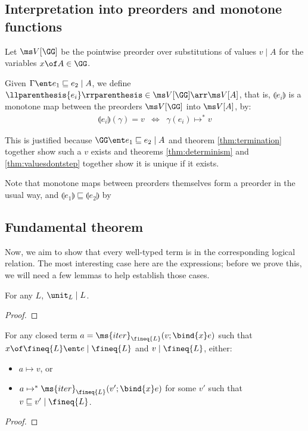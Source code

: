 \documentclass{article}
\newcommand{\ale}{\sqsubseteq}
\newcommand{\iter}[4]{\ms{iter}_{#1}({#2}; \bind{#3}#4)}
\newcommand{\step}{\mapsto}
\newcommand{\steps}{\step^*}
\newcommand{\lr}[2]{#2\mathrel{|}#1}
\newcommand{\lrcx}[3]{#1 \ent \lr{#2}{#3}}
\begin{document}

\subsection{Interpretation into preorders and monotone functions}

\newcommand{\I}[1]{\llparenthesis{#1}\rrparenthesis}

Let $\Val{\GG}$ be the pointwise preorder over substitutions of values
$\lr{A}{v}$ for the variables $x \of A \in \GG$.

Given $\lrcx{\Gamma}{A}{e_1 \ale e_2}$, we define $\I{e_i} \in \Val{\GG} \arr
\Val{A}$, that is, $\I{e_i}$ is a monotone map between the preorders $\Val{\GG}$
into $\Val{A}$, by:
\[\begin{array}{rcll}
  \I{e_i}(\gamma) = v &\iff& \gamma(e_i) \steps v
\end{array}\]

This is justified because $\lrcx{\GG}{A}{e_1 \ale e_2}$ and theorem
\ref{thm:termination} together show such a $v$ exists and theorems
\ref{thm:determinism} and \ref{thm:valuesdontstep} together show it is unique if
it exists.

Note that monotone maps between preorders themselves form a preorder in the
usual way, and $\I{e_1} \ale \I{e_2}$ by 


\subsection{Fundamental theorem}

Now, we aim to show that every well-typed term is in the corresponding logical
relation. The most interesting case here are the  expressions; before we
prove this, we will need a few lemmas to help establish those cases.

\begin{lemma}
  For any $L$, $\lr{L}{\unit_L}$.
\end{lemma}
\begin{proof}
  \TODO
\end{proof}

\begin{lemma}\label{thm:iterstep}
  For any closed term $a = \iter{\fineq{L}}{v}{x}{e}$ such that $\lrcx{x \of
    \fineq{L}}{\fineq{L}}{e}$ and $\lr{\fineq{L}}{v}$, either:
  \begin{itemize}
  \item $a \step v$, or
  \item $a \steps \iter{\fineq{L}}{v'}{x}{e}$ for some $v'$ such that
    $\lr{\fineq{L}}{v \ale v'}$.
  \end{itemize}
\end{lemma}
\begin{proof}
  \TODO
\end{proof}
\end{document}
